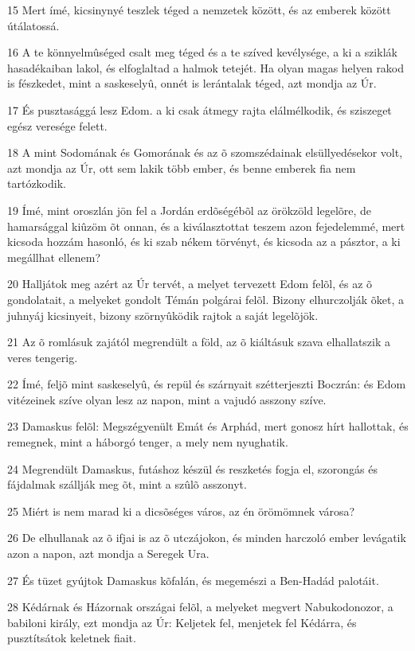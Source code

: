 \par 15 Mert ímé, kicsinynyé teszlek téged a nemzetek között, és az emberek között útálatossá.
\par 16 A te könnyelmûséged csalt meg téged és a te szíved kevélysége, a ki a sziklák hasadékaiban lakol, és elfoglaltad a halmok tetejét. Ha olyan magas helyen rakod is fészkedet, mint a saskeselyû, onnét is lerántalak téged, azt mondja az Úr.
\par 17 És pusztasággá lesz Edom. a ki csak átmegy rajta elálmélkodik, és sziszeget egész veresége felett.
\par 18 A mint Sodomának és Gomorának és az õ szomszédainak elsüllyedésekor volt, azt mondja az Úr, ott sem lakik több ember, és benne emberek fia nem tartózkodik.
\par 19 Ímé, mint oroszlán jön fel a Jordán erdõségébõl az örökzöld legelõre, de hamarsággal kiûzöm õt onnan, és a kiválasztottat teszem azon fejedelemmé, mert kicsoda hozzám hasonló, és ki szab nékem törvényt, és kicsoda az a pásztor, a ki megállhat ellenem?
\par 20 Halljátok meg azért az Úr tervét, a melyet tervezett Edom felõl, és az õ gondolatait, a melyeket gondolt Témán polgárai felõl. Bizony elhurczolják õket, a juhnyáj kicsinyeit, bizony szörnyûködik rajtok a saját legelõjök.
\par 21 Az õ romlásuk zajától megrendült a föld, az õ kiáltásuk szava elhallatszik a veres tengerig.
\par 22 Ímé, feljõ mint saskeselyû, és repül és szárnyait szétterjeszti Boczrán: és Edom vitézeinek szíve olyan lesz az napon, mint a vajudó asszony szíve.
\par 23 Damaskus felõl: Megszégyenült Emát és Arphád, mert gonosz hírt hallottak, és remegnek, mint a háborgó tenger, a mely nem nyughatik.
\par 24 Megrendült Damaskus, futáshoz készül és reszketés fogja el, szorongás és fájdalmak szállják meg õt, mint a szûlõ asszonyt.
\par 25 Miért is nem marad ki a dicsõséges város, az én örömömnek városa?
\par 26 De elhullanak az õ ifjai is az õ utczájokon, és minden harczoló ember levágatik azon a napon, azt mondja a Seregek Ura.
\par 27 És tüzet gyújtok Damaskus kõfalán, és megemészi a Ben-Hadád palotáit.
\par 28 Kédárnak és Házornak országai felõl, a melyeket megvert Nabukodonozor, a babiloni király, ezt mondja az Úr: Keljetek fel, menjetek fel Kédárra, és pusztítsátok keletnek fiait.
